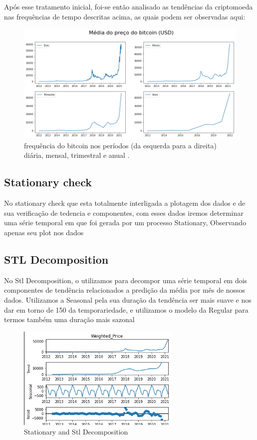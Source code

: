 \documentclass[sigplan,screen]{acmart}
\begin{document}
Após esse tratamento inicial, foi-se então analisado as tendências da criptomoeda nas frequências de tempo descritas acima, as quais podem ser observadas aqui:
\begin{figure}[h]
  \centering
  \includegraphics[width=\linewidth]{ibagens/Estudante.png}
  \caption{frequência do bitcoin nos períodos (da esquerda para a direita) diária, mensal, trimestral e anual .}
\end{figure}

\subsection{Stationary check}
No stationary check que esta totalmente interligada a plotagem dos dados e de sua verificação de tedencia e componentes, com esses dados iremos determinar uma série temporal em que foi gerada por um processo Stationary, Observando apenas seu plot nos dados
\subsection{STL Decomposition}
No Stl Decomposition, o utilizamos para decompor uma série temporal em dois componentes de tendência relacionados a predição da média por mês de nossos dados. Utilizamos a Seasonal  pela sua duração da tendência ser mais suave e nos dar em torno de 150 da temporariedade, e utilizamos o modelo da Regular para termos também uma duração mais sazonal 
\begin{figure}[h]
  \centering
  \includegraphics[width=\linewidth]{ibagens/unknown.png}
  \caption{Stationary and Stl Decomposition}
\end{figure}
\end{document}
